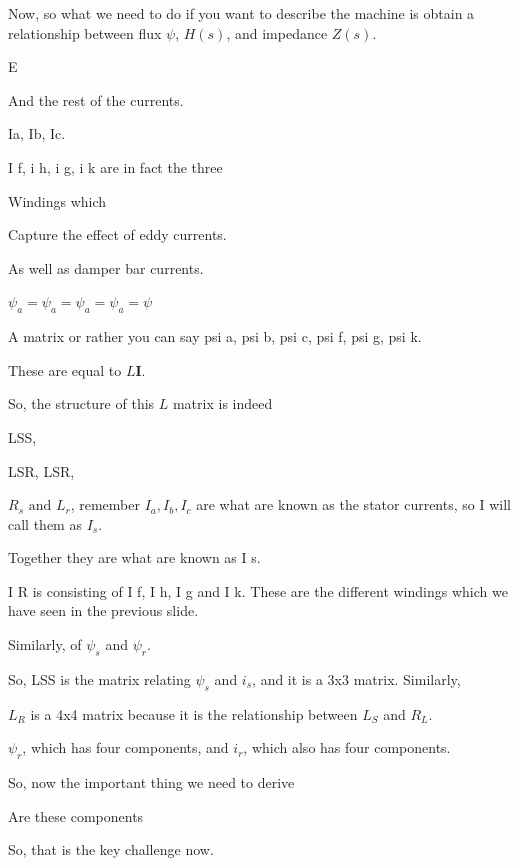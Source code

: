 \documentclass{article}
\begin{document}
Now, so what we need to do if you want to describe the machine is obtain a relationship between flux $\psi$, $H(s)$, and impedance $Z(s)$.

E

And the rest of the currents.

Ia, Ib, Ic.

I f, i h, i g, i k are in fact the three

Windings which

Capture the effect of eddy currents.

As well as damper bar currents.

$\psi_a = \psi_a = \psi_a = \psi_a = \psi$

A matrix or rather you can say psi a, psi b, psi c, psi f, psi g, psi k.

These are equal to $L \mathbf{I}$.

So, the structure of this $L$ matrix is indeed

LSS,

LSR, LSR,

$R_s \text{ and } L_r$, remember $I_a, I_b, I_c$ are what are known as the stator currents, so I will call them as $I_s$.

Together they are what are known as I s.

I R is consisting of I f, I h, I g and I k. These are the different windings which we have seen in the previous slide.

Similarly, of $\psi_s$ and $\psi_r$.

So, LSS is the matrix relating $\psi_s$ and $i_s$, and it is a 3x3 matrix. Similarly,

$L_R$ is a 4x4 matrix because it is the relationship between $L_S$ and $R_L$.

$\psi_r$, which has four components, and $i_r$, which also has four components.

So, now the important thing we need to derive

Are these components

So, that is the key challenge now.
\end{document}
